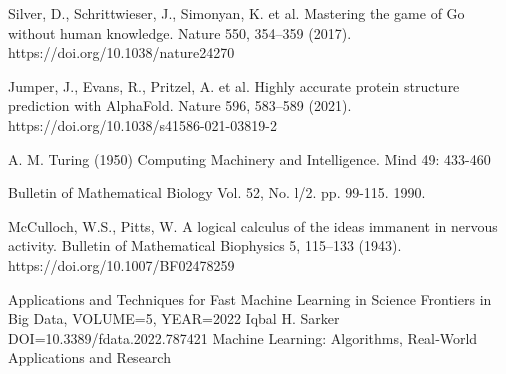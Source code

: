 \documentclass[preprint,aps,nofootinbib,a4paper,superscriptaddress,longbibliography,amsfonts,amssymb,amsmath,titlepage]{revtex4-2}
\begin{document}
\begin{thebibliography}{9}
Silver, D., Schrittwieser, J., Simonyan, K. et al. Mastering the game of Go without human knowledge. Nature 550, 354–359 (2017). https://doi.org/10.1038/nature24270

Jumper, J., Evans, R., Pritzel, A. et al. Highly accurate protein structure prediction with AlphaFold. Nature 596, 583–589 (2021). https://doi.org/10.1038/s41586-021-03819-2

A. M. Turing (1950) Computing Machinery and Intelligence. Mind 49: 433-460

Bulletin of Mathematical Biology Vol. 52, No. l/2. pp. 99-115. 1990.

McCulloch, W.S., Pitts, W. A logical calculus of the ideas immanent in nervous activity. Bulletin of Mathematical Biophysics 5, 115–133 (1943). https://doi.org/10.1007/BF02478259

Applications and Techniques for Fast Machine Learning in Science  
Frontiers in Big Data, VOLUME=5, YEAR=2022   
Iqbal H. Sarker
DOI=10.3389/fdata.2022.787421
Machine Learning: Algorithms, Real‑World Applications and Research
\end{thebibliography}
\end{document}
